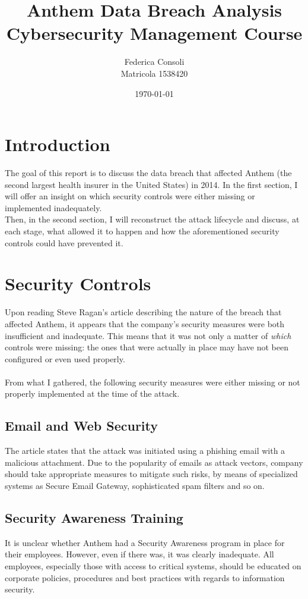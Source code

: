\documentclass[12pt]{extarticle}
\title{%
	Anthem Data Breach Analysis\\
	\large Cybersecurity Management Course}
\author{Federica Consoli\\Matricola 1538420}
\date{\today}
\begin{document}
	\maketitle
	\newpage
	\tableofcontents
	\newpage
	\section{Introduction}
	The goal of this report is to discuss the data breach that affected Anthem (the second largest health insurer in the United States) in 2014. In the first section, I will offer an insight on which security controls were either missing or implemented inadequately.\\ Then, in the second section, I will reconstruct the attack lifecycle and discuss, at each stage, what allowed it to happen and how the aforementioned security controls could have prevented it. 
	\section{Security Controls}
	Upon reading Steve Ragan's article \cite{breacharticle} describing the nature of the breach that affected Anthem, it appears that the company's security measures were both insufficient and inadequate. This means that it was not only a matter of \textit{which} controls were missing: the ones that were actually in place may have not been configured or even used properly.\\\\
	From what I gathered, the following security measures were either missing or not properly implemented at the time of the attack. 
	\subsection{Email and Web Security}
	The article states that the attack was initiated using a phishing email with a malicious attachment. Due to the popularity of emails as attack vectors, company should take appropriate measures to mitigate such risks, by means of specialized systems as Secure Email Gateway, sophisticated spam filters and so on.
	\subsection{Security Awareness Training}
	It is unclear whether Anthem had a Security Awareness program in place for their employees. However, even if there was, it was clearly inadequate. All employees, especially those with access to critical systems, should be educated on corporate policies, procedures and best practices with regards to information security.
\end{document}
